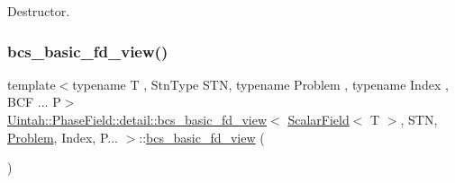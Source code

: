 Destructor. 

\mbox{\label{classUintah_1_1PhaseField_1_1detail_1_1bcs__basic__fd__view_3_01ScalarField_3_01T_01_4_00_01STN_07caa9955adf783da0505eac75e76f08_a383094a6f77183df1e6799934780adce}} 
\subsubsection{\texorpdfstring{bcs\+\_\+basic\+\_\+fd\+\_\+view()}{bcs\_basic\_fd\_view()}\hspace{0.1cm}{\footnotesize\ttfamily [4/4]}}
{\footnotesize\ttfamily template$<$typename T , Stn\+Type S\+TN, typename Problem , typename Index , B\+C\+F ... P$>$ \\
\hyperlink{classUintah_1_1PhaseField_1_1detail_1_1bcs__basic__fd__view}{Uintah\+::\+Phase\+Field\+::detail\+::bcs\+\_\+basic\+\_\+fd\+\_\+view}$<$ \hyperlink{structUintah_1_1PhaseField_1_1ScalarField}{Scalar\+Field}$<$ T $>$, S\+TN, \hyperlink{classUintah_1_1PhaseField_1_1Problem}{Problem}, Index, P... $>$\+::\hyperlink{classUintah_1_1PhaseField_1_1detail_1_1bcs__basic__fd__view}{bcs\+\_\+basic\+\_\+fd\+\_\+view} (\begin{DoxyParamCaption}\item[{const \hyperlink{classUintah_1_1PhaseField_1_1detail_1_1bcs__basic__fd__view}{bcs\+\_\+basic\+\_\+fd\+\_\+view}$<$ \hyperlink{structUintah_1_1PhaseField_1_1ScalarField}{Scalar\+Field}$<$ T $>$, S\+TN, \hyperlink{classUintah_1_1PhaseField_1_1Problem}{Problem}, Index, P... $>$ \&}]{ }\end{DoxyParamCaption})\hspace{0.3cm}{\ttfamily [delete]}}



